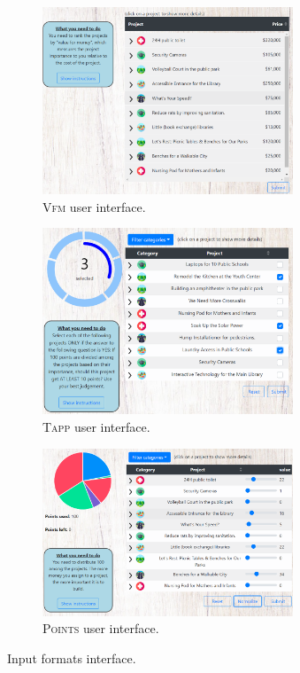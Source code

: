 \documentclass[letterpaper]{article} %
\newcommand{\points}{\textsc{Points}}
\newcommand{\vfm}{\textsc{Vfm}}
\newcommand{\tapp}{\textsc{Tapp}}
\begin{document}
\begin{figure}[ht!]
\begin{subfigure}[b]{0.45\textwidth}
         \centering
\includegraphics[width=7.5cm]{experiment/ranking by cost.PNG}
\caption{\vfm{} user interface.
}\label{fig:vfm_inter}
     \end{subfigure}
     \begin{subfigure}[b]{0.45\textwidth}
         \centering
\includegraphics[width=7.5cm]{experiment/threshold approval.PNG}
\caption{\tapp{} user interface.
}\label{fig:tapp_inter}
     \end{subfigure}
     \hfill
     \begin{subfigure}[b]{0.45\textwidth}
         \centering
\includegraphics[width=7.5cm]{experiment/utilities.PNG}
\caption{\points{} user interface.
}\label{fig:util_inter}
     \end{subfigure}
     

        \caption{Input formats interface.}
        \label{fig:all_interfaces}
\end{figure}
\end{document}
